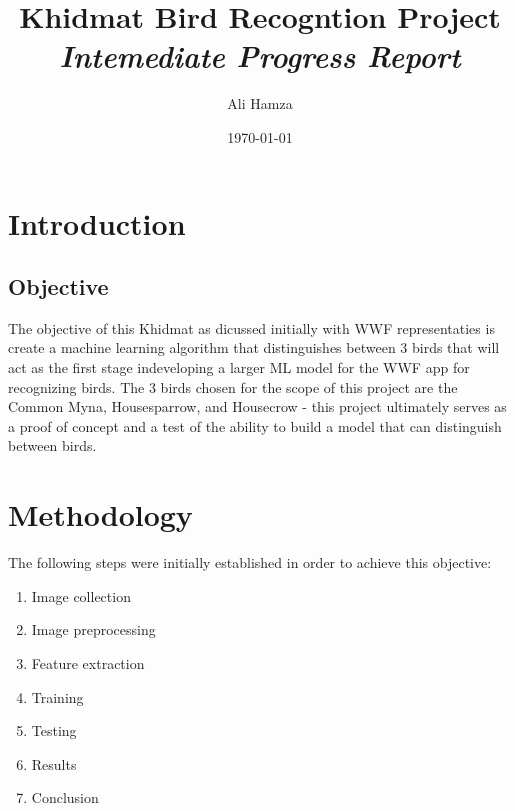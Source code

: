 \documentclass{article}
\title{Khidmat Bird Recogntion Project\\ \textit{Intemediate Progress Report}}
\author{Ali Hamza}
\date{\today}
\begin{document}
    \maketitle
    \section*{Introduction}
    \subsection*{Objective}
    The objective of this Khidmat as dicussed initially with WWF representaties is create a machine learning algorithm that distinguishes between 3 birds that will act as the first stage indeveloping a larger ML model for the WWF app for recognizing birds. The 3 birds chosen for the scope of this project are the Common Myna, Housesparrow, and Housecrow - this project ultimately serves as a proof of concept and a test of the ability to build a model that can distinguish between birds.

    \section*{Methodology}
    The following steps were initially established in order to achieve this objective:
    
    \begin{enumerate}
        \item Image collection
        \item Image preprocessing
        \item Feature extraction
        \item Training
        \item Testing
        \item Results
        \item Conclusion
    \end{enumerate}
\end{document}
